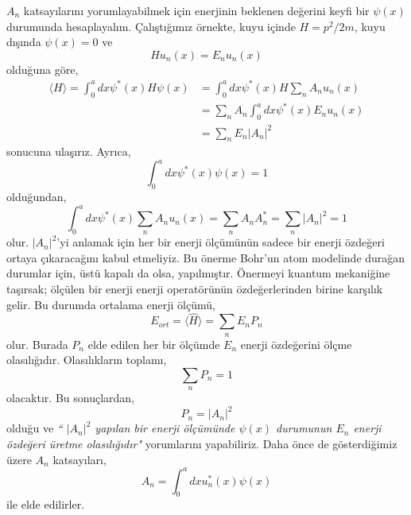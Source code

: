 \documentclass[a4paper,12pt, twoside]{article}
\begin{document}
$A_n$ katsayılarını yorumlayabilmek için enerjinin beklenen değerini keyfi bir $\psi(x)$ durumunda hesaplayalım. Çalıştığımız örnekte, kuyu içinde $H=p^2/2m$, kuyu dışında $\psi(x)=0$ ve
\begin{equation}
H u _ { n } ( x ) = E _ { n } u _ { n } ( x )
\end{equation}
olduğuna göre,
\begin{equation}
\begin{aligned} 
\langle H \rangle = \int _ { 0 } ^ { a } d x \psi ^ { * } ( x ) H \psi ( x ) 
& = \int _ { 0 } ^ { a } d x \psi ^ { * } ( x ) H \sum _ { n } A _ { n } u _ { n } ( x ) \\ 
& = \sum _ { n } A _ { n } \int^ { a }_{ 0 } d x \psi ^ { * } ( x ) E _ { n } u _ { n } ( x ) \\ 
& = \sum _ { n } E _ { n } \left| A _ { n } \right| ^ { 2 } 
\end{aligned}
\end{equation}
sonucuna ulaşırız. Ayrıca,
\begin{equation}
\int _ { 0 } ^ { a } d x \psi ^ { * } ( x ) \psi ( x ) = 1
\end{equation}
olduğundan,
\begin{equation}
\int _ { 0 } ^ { a } d x \psi ^ { * } ( x ) \sum _ { n } A _ { n } u _ { n } ( x ) 
= \sum _ { n } A _ { n } A _ { n } ^ { * } 
= \sum _ { n } \left| A _ { n } \right| ^ { 2 } = 1
\end{equation}
olur. $|A_n|^2$'yi anlamak için her bir enerji ölçümünün sadece bir enerji özdeğeri ortaya çıkaracağını kabul etmeliyiz. Bu önerme Bohr'un atom modelinde durağan durumlar için, üstü kapalı da olsa, yapılmıştır. Önermeyi kuantum mekaniğine taşırsak; ölçülen bir enerji enerji operatörünün özdeğerlerinden birine karşılık gelir. Bu durumda ortalama enerji ölçümü,
\begin{equation}
E _ {ort} = \langle \hat H \rangle = \sum _ { n } E _ { n } P _ { n }
\end{equation}
olur. Burada $P_n$ elde edilen her bir ölçümde $E_n$ enerji özdeğerini ölçme olasılığıdır. Olasılıkların toplamı,
\begin{equation}
\sum _ { n } P _ { n } = 1
\end{equation}
olacaktır. Bu sonuçlardan,
\begin{equation}
P_n = |A_n|^2
\end{equation}
olduğu ve \emph{`` $|A_n|^2$ yapılan bir enerji ölçümünde $\psi(x)$ durumunun $E_n$ enerji özdeğeri üretme olasılığıdır"} yorumlarını yapabiliriz. Daha önce de gösterdiğimiz üzere $A_n$ katsayıları,
\begin{equation}
A _ { n } = \int _ { 0 } ^ { a } d x u _ { n } ^ { * } ( x ) \psi ( x )
\end{equation}
ile elde edilirler.
\end{document}
